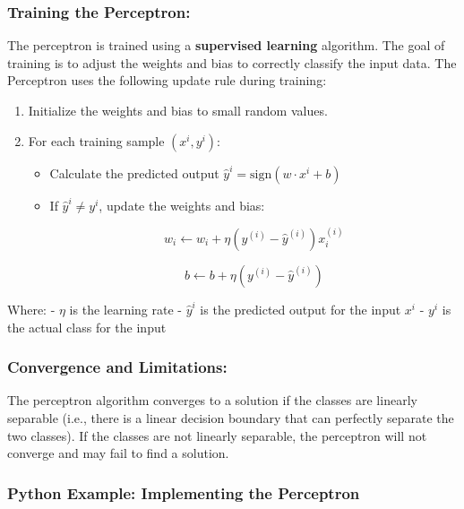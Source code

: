 \documentclass[11pt]{article}
\providecommand{\tightlist}{%
      \setlength{\itemsep}{0pt}\setlength{\parskip}{0pt}}
\begin{document}
\subsubsection{Training the Perceptron:}\label{training-the-perceptron}

The perceptron is trained using a \textbf{supervised learning}
algorithm. The goal of training is to adjust the weights and bias to
correctly classify the input data. The Perceptron uses the following
update rule during training:

\begin{enumerate}
\def\labelenumi{\arabic{enumi}.}
\tightlist
\item
  Initialize the weights and bias to small random values.
\item
  For each training sample $ (x^i, y^i) $:

  \begin{itemize}
  \item
    Calculate the predicted output $ \hat{y}^i = \text{sign}(w
    \cdot x^i + b) $
  \item
    If $ \hat{y}^i \neq y^i $, update the weights
    and bias:

    $$ w_i \leftarrow w_i + \eta (y^{(i)} - \hat{y}^{(i)}) x_i^{(i)} $$

    $$ b \leftarrow b + \eta (y^{(i)} - \hat{y}^{(i)}) $$
  \end{itemize}
\end{enumerate}

Where: - $ \eta $ is the learning rate - $ \hat{y}^i $ is
the predicted output for the input $ x^i $ - $ y^i
$ is the actual class for the input

\subsubsection{Convergence and
Limitations:}\label{convergence-and-limitations}

The perceptron algorithm converges to a solution if the classes are
linearly separable (i.e., there is a linear decision boundary that can
perfectly separate the two classes). If the classes are not linearly
separable, the perceptron will not converge and may fail to find a
solution.

\subsubsection{Python Example: Implementing the
Perceptron}\label{python-example-implementing-the-perceptron}
\end{document}
